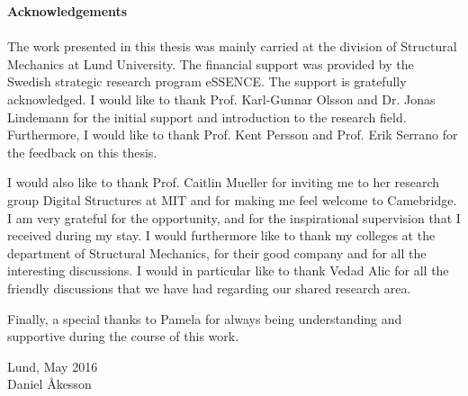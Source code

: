 \null\vfill

{\Huge \textbf{Acknowledgements}} \\ \\

The work presented in this thesis was mainly carried at the division of Structural Mechanics at Lund University. The financial support was provided by the Swedish strategic research program eSSENCE. The support is gratefully acknowledged. I would like to thank Prof. Karl-Gunnar Olsson and Dr. Jonas Lindemann for the initial support and introduction to the research field. Furthermore, I would like to thank Prof. Kent Persson and Prof. Erik Serrano for the feedback on this thesis.

I would also like to thank Prof. Caitlin Mueller for inviting me to her research group Digital Structures at MIT and for making me feel welcome to Camebridge. I am very grateful for the opportunity, and for the inspirational supervision that I received during my stay. I would furthermore like to thank my colleges  at the department of Structural Mechanics, for their good company and for all the interesting discussions. I would in particular like to thank Vedad Alic for all the friendly discussions that we have had regarding our shared research area.

Finally, a special thanks to Pamela for always being understanding and supportive during the course of this work.


\vspace{1cm}

\begin{flushright}
Lund, May 2016\\Daniel Åkesson
\end{flushright}

\vfill\vfill\vfill\vfill\null